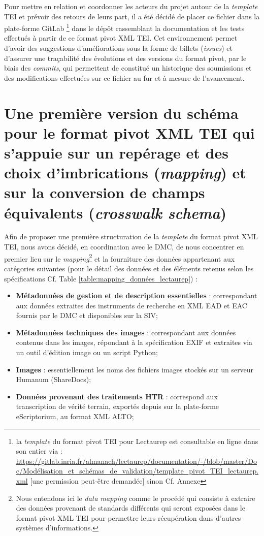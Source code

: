 \newpage
Pour mettre en relation et coordonner les acteurs du projet autour de la \textit{template} TEI et prévoir des retours de leurs part, il a été décidé de placer ce fichier dans la plate-forme GitLab \footnote{la \textit{template} du format pivot TEI pour Lectaurep est consultable en ligne dans son entier via : \url{https://gitlab.inria.fr/almanach/lectaurep/documentation/-/blob/master/Doc/Modélisation_et_schémas_de_validation/template_pivot_TEI_lectaurep.xml} [une permission peut-être demandée] sinon Cf. Annexe} dans le dépôt rassemblant la documentation et les tests effectués à partir de ce format pivot XML TEI. Cet environnement permet d'avoir des suggestions d'améliorations sous la forme de billets (\textit{issues}) et d'assurer une traçabilité des évolutions et des versions du format pivot, par le biais des \textit{commits}, qui permettent de constitué un historique des soumissions et des modifications effectuées sur ce fichier au fur et à mesure de l'avancement. 
\newpage

\section{Une première version du schéma pour le format pivot XML TEI qui s'appuie sur un repérage et des choix d'imbrications (\textit{mapping}) et sur la conversion de champs équivalents (\textit{crosswalk schema})}


Afin de proposer une première structuration de la \textit{template} du format pivot XML TEI, nous avons décidé, en coordination avec le DMC, de nous concentrer en premier lieu sur le \textit{mapping}\footnote{Nous entendons ici le \textit{data mapping} comme le procédé qui consiste à extraire des données provenant de standards différents qui seront exposées dans le format pivot XML TEI pour permettre leurs récupération dans d'autres systèmes d'informations.} et la fourniture des données appartenant aux catégories suivantes (pour le détail des données et des éléments retenus selon les spécifications Cf. Table \ref{table:mapping_données_lectaurep}) :  

\begin{itemize}
    \item \textbf{Métadonnées de gestion et de description essentielles} : correspondant aux données extraites des instruments de recherche en XML EAD et EAC fournis par le DMC et disponibles sur la SIV;
    \item \textbf{Métadonnées techniques des images} : correspondant aux données contenus dans les images, répondant à la spécification EXIF et extraites via un outil d'édition image ou un script Python;
    \item \textbf{Images} : essentiellement les noms des fichiers images stockés sur un serveur Humanum (ShareDocs);
    \item \textbf{Données provenant des traitements HTR} : correspond aux transcription de vérité terrain, exportés depuis sur la plate-forme eScriptorium, au format XML ALTO;
\end{itemize}

